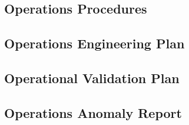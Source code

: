 \subsection{Operations Procedures}
\label{sec:Operations Procedures}


\subsection{Operations Engineering Plan}
\label{sec:Operations Engineering Plan}


\subsection{Operational Validation Plan}
\label{sec:Operational Validation Plan}


\subsection{Operations Anomaly Report}
\label{sec:Operations Anomaly Report}
